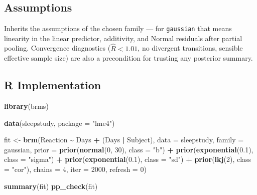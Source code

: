 \documentclass[
]{article}
\newenvironment{Shaded}{\begin{snugshade}}{\end{snugshade}}
\newcommand{\AttributeTok}[1]{\textcolor[rgb]{0.13,0.29,0.53}{#1}}
\newcommand{\DecValTok}[1]{\textcolor[rgb]{0.00,0.00,0.81}{#1}}
\newcommand{\FloatTok}[1]{\textcolor[rgb]{0.00,0.00,0.81}{#1}}
\newcommand{\FunctionTok}[1]{\textcolor[rgb]{0.13,0.29,0.53}{\textbf{#1}}}
\newcommand{\NormalTok}[1]{#1}
\newcommand{\OtherTok}[1]{\textcolor[rgb]{0.56,0.35,0.01}{#1}}
\newcommand{\SpecialCharTok}[1]{\textcolor[rgb]{0.81,0.36,0.00}{\textbf{#1}}}
\newcommand{\StringTok}[1]{\textcolor[rgb]{0.31,0.60,0.02}{#1}}
\begin{document}
\subsection{Assumptions}\label{assumptions}

Inherits the assumptions of the chosen family --- for \texttt{gaussian}
that means linearity in the linear predictor, additivity, and Normal
residuals after partial pooling. Convergence diagnostics
(\(\hat R < 1.01\), no divergent transitions, sensible effective sample
size) are also a precondition for trusting any posterior summary.

\subsection{R Implementation}\label{r-implementation}

\begin{Shaded}
\begin{Highlighting}[]
\FunctionTok{library}\NormalTok{(brms)}

\FunctionTok{data}\NormalTok{(sleepstudy, }\AttributeTok{package =} \StringTok{"lme4"}\NormalTok{)}

\NormalTok{fit }\OtherTok{\textless{}{-}} \FunctionTok{brm}\NormalTok{(Reaction }\SpecialCharTok{\textasciitilde{}}\NormalTok{ Days }\SpecialCharTok{+}\NormalTok{ (Days }\SpecialCharTok{|}\NormalTok{ Subject),}
           \AttributeTok{data =}\NormalTok{ sleepstudy,}
           \AttributeTok{family =}\NormalTok{ gaussian,}
           \AttributeTok{prior =} \FunctionTok{prior}\NormalTok{(}\FunctionTok{normal}\NormalTok{(}\DecValTok{0}\NormalTok{, }\DecValTok{30}\NormalTok{), }\AttributeTok{class =} \StringTok{"b"}\NormalTok{) }\SpecialCharTok{+}
                   \FunctionTok{prior}\NormalTok{(}\FunctionTok{exponential}\NormalTok{(}\FloatTok{0.1}\NormalTok{), }\AttributeTok{class =} \StringTok{"sigma"}\NormalTok{) }\SpecialCharTok{+}
                   \FunctionTok{prior}\NormalTok{(}\FunctionTok{exponential}\NormalTok{(}\FloatTok{0.1}\NormalTok{), }\AttributeTok{class =} \StringTok{"sd"}\NormalTok{) }\SpecialCharTok{+}
                   \FunctionTok{prior}\NormalTok{(}\FunctionTok{lkj}\NormalTok{(}\DecValTok{2}\NormalTok{), }\AttributeTok{class =} \StringTok{"cor"}\NormalTok{),}
           \AttributeTok{chains =} \DecValTok{4}\NormalTok{, }\AttributeTok{iter =} \DecValTok{2000}\NormalTok{, }\AttributeTok{refresh =} \DecValTok{0}\NormalTok{)}

\FunctionTok{summary}\NormalTok{(fit)}
\FunctionTok{pp\_check}\NormalTok{(fit)}
\end{Highlighting}
\end{Shaded}
\end{document}
